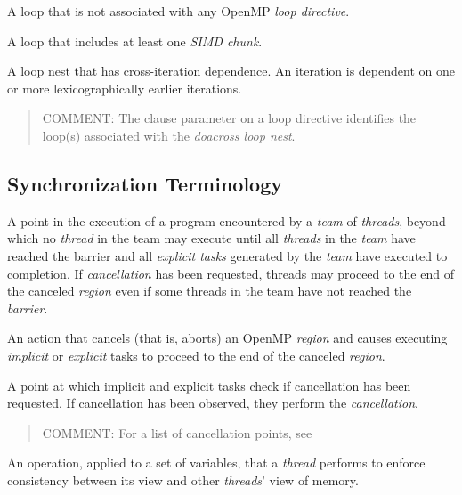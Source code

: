 \glossarydefstart
A loop that is not associated with any OpenMP \emph{loop directive}.
\glossarydefend

\glossarydefstart
A loop that includes at least one \emph{SIMD chunk}.
\glossarydefend

\glossarydefstart
A loop nest that has cross-iteration dependence. An iteration is dependent on one or more lexicographically earlier iterations.
\begin{quote}
COMMENT: The  clause parameter on a loop directive identifies the loop(s) associated with the \emph{doacross loop nest}.
\end{quote}
\glossarydefend

%
%
\subsection{Synchronization Terminology}
\label{subsec:Synchronization Terminology}
\glossarydefstart
A point in the execution of a program encountered by a \emph{team} of \emph{threads}, beyond 
which no \emph{thread} in the team may execute until all \emph{threads} in the \emph{team} have 
reached the barrier and all \emph{explicit tasks} generated by the \emph{team} have executed to 
completion. If \emph{cancellation} has been requested, threads may proceed to the end of 
the canceled \emph{region} even if some threads in the team have not reached the \emph{barrier}.
\glossarydefend

\glossarydefstart
An action that cancels (that is, aborts) an OpenMP \emph{region} and causes executing 
\emph{implicit} or \emph{explicit} tasks to proceed to the end of the canceled \emph{region}. 
\glossarydefend

\glossarydefstart
A point at which implicit and explicit tasks check if cancellation has been 
requested. If cancellation has been observed, they perform the \emph{cancellation}. 

\begin{quote}
COMMENT: For a list of cancellation points, see 
\end{quote}
\glossarydefend
\bigskip

\glossarydefstart
An operation, applied to a set of variables, that a \emph{thread} performs
to enforce consistency between its view and other \emph{threads}' view of
memory.
\glossarydefend

